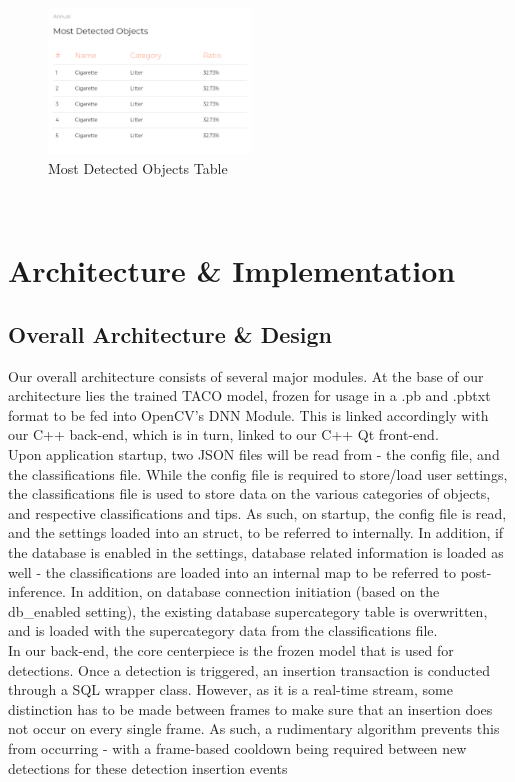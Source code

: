 \documentclass[conference]{IEEEtran}
\begin{document}
\begin{figure}[h]
    \centering
    \includegraphics[width=0.48\textwidth]{images/chart_most_detected.eps}
    \caption{Most Detected Objects Table}
\end{figure}~\\

\newpage
\section{Architecture & Implementation}
\subsection{Overall Architecture & Design}
Our overall architecture consists of several major modules. At the base of our architecture lies the trained TACO model, frozen for usage in a .pb and .pbtxt format to be fed into OpenCV's DNN Module. This is linked accordingly with our C++ back-end, which is in turn, linked to our C++ Qt front-end.\\

Upon application startup, two JSON files will be read from - the config file, and the classifications file. While the config file is required to store/load user settings, the classifications file is used to store data on the various categories of objects, and respective classifications and tips. As such, on startup, the config file is read, and the settings loaded into an struct, to be referred to internally. In addition, if the database is enabled in the settings, database related information is loaded as well - the classifications are loaded into an internal map to be referred to post-inference. In addition, on database connection initiation (based on the db\_enabled setting), the existing database supercategory table is overwritten, and is loaded with the supercategory data from the classifications file.\\

In our back-end, the core centerpiece is the frozen model that is used for detections. Once a detection is triggered, an insertion transaction is conducted through a SQL wrapper class. However, as it is a real-time stream, some distinction has to be made between frames to make sure that an insertion does not occur on every single frame. As such, a rudimentary algorithm prevents this from occurring - with a frame-based cooldown being required between new detections for these detection insertion events\\
\end{document}
